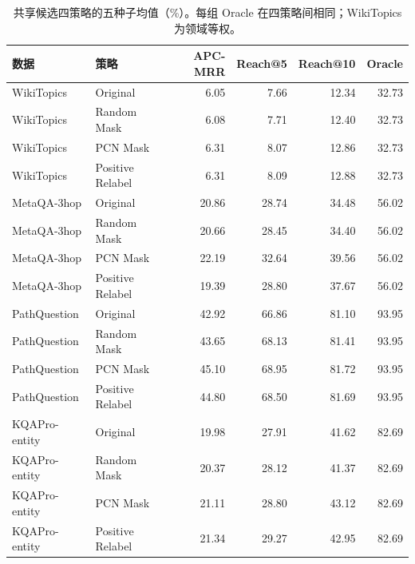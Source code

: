 \documentclass[UTF8,a4paper,10pt,fontset=fandol]{ctexart}
\begin{document}
\begin{table}[tbp]\centering
\caption{共享候选四策略的五种子均值（\%）。每组 Oracle 在四策略间相同；WikiTopics 为领域等权。}\label{tab:main}
\small
\begin{tabular}{llrrrr}
\toprule
数据 & 策略 & APC-MRR & Reach@5 & Reach@10 & Oracle \\
\midrule
WikiTopics & Original & 6.05 & 7.66 & 12.34 & 32.73 \\
WikiTopics & Random Mask & 6.08 & 7.71 & 12.40 & 32.73 \\
WikiTopics & PCN Mask & 6.31 & 8.07 & 12.86 & 32.73 \\
WikiTopics & Positive Relabel & 6.31 & 8.09 & 12.88 & 32.73 \\
MetaQA-3hop & Original & 20.86 & 28.74 & 34.48 & 56.02 \\
MetaQA-3hop & Random Mask & 20.66 & 28.45 & 34.40 & 56.02 \\
MetaQA-3hop & PCN Mask & 22.19 & 32.64 & 39.56 & 56.02 \\
MetaQA-3hop & Positive Relabel & 19.39 & 28.80 & 37.67 & 56.02 \\
PathQuestion & Original & 42.92 & 66.86 & 81.10 & 93.95 \\
PathQuestion & Random Mask & 43.65 & 68.13 & 81.41 & 93.95 \\
PathQuestion & PCN Mask & 45.10 & 68.95 & 81.72 & 93.95 \\
PathQuestion & Positive Relabel & 44.80 & 68.50 & 81.69 & 93.95 \\
KQAPro-entity & Original & 19.98 & 27.91 & 41.62 & 82.69 \\
KQAPro-entity & Random Mask & 20.37 & 28.12 & 41.37 & 82.69 \\
KQAPro-entity & PCN Mask & 21.11 & 28.80 & 43.12 & 82.69 \\
KQAPro-entity & Positive Relabel & 21.34 & 29.27 & 42.95 & 82.69 \\
\bottomrule
\end{tabular}
\end{table}
\end{document}
